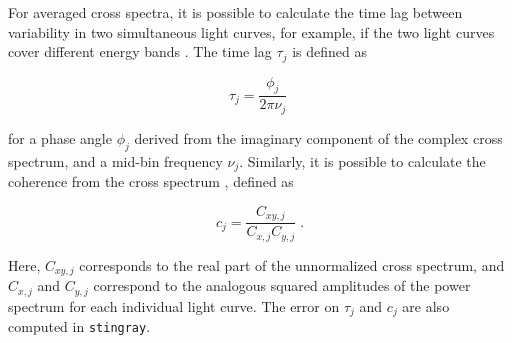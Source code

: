 \documentclass[twocolumn]{aastex62}
\newcommand{\stingray}{\texttt{stingray}\xspace}
\begin{document}
For averaged cross spectra, it is possible to calculate the time lag between variability in two simultaneous light curves, for example, if the two light curves cover different energy bands \citep{Vaughanetal94}. 
The time lag $\tau_j$ is defined as

\[
\tau_j = \frac{\phi_j}{2\pi\nu_j} \; 
\]

\noindent for a phase angle $\phi_j$ derived from the imaginary component of the complex cross spectrum, and a mid-bin frequency $\nu_j$. 
Similarly, it is possible to calculate the coherence from the cross spectrum \citep{vaughan1997,nowak1999}, defined as 

\begin{equation}
c_j = \frac{C_{xy,j}}{C_{x,j} C_{y,j}} \; . 
\end{equation}

\noindent Here, $C_{xy,j}$ corresponds to the real part of the unnormalized cross spectrum, and $C_{x,j}$ and $C_{y,j}$ correspond to the analogous squared amplitudes of the power spectrum for each individual light curve. 
The error on $\tau_j$ and $c_j$ are also computed in \stingray.
\end{document}
